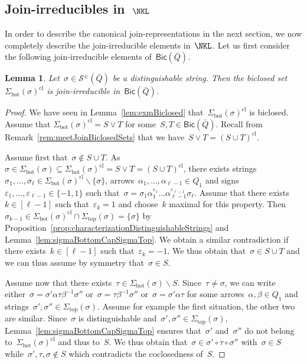 \documentclass{memo-l}
\newtheorem{lemma}[theorem]{Lemma}
\theoremstyle{definition}
\newcommand{\ssm}{\smallsetminus} %
\newcommand{\strings}{\mathcal{S}} %
\renewcommand{\top}{\mathrm{top}} %
\newcommand{\bottom}{\mathrm{bot}} %
\newcommand{\join}{\vee} %
\newcommand{\closure}[1]{#1^{\mathrm{cl}}} %
\newcommand{\Bicl}[1]{\mathsf{Bic}(#1)} %
\begin{document}
\subsection{Join-irreducibles in~$\NKL$}

In order to describe the canonical join-representations in the next section, we now completely describe the join-irreducible elements in~$\NKL$.
Let us first consider the following join-irreducible elements of~$\Bicl{\bar Q}$.

\begin{lemma}
\label{lem:exmBiclosedJI}
Let~$\sigma \in \strings^\pm(\bar Q)$ be a distinguishable string. Then the biclosed set~$\closure{\Sigma_\bottom(\sigma)}$ is join-irreducible in~$\Bicl{\bar Q}$.
\end{lemma}

\begin{proof}
We have seen in Lemma~\ref{lem:exmBiclosed} that~$\closure{\Sigma_\bottom(\sigma)}$ is biclosed.
Assume that $\closure{\Sigma_\bottom(\sigma)} = S \join T$ for some~$S,T \in \Bicl{\bar Q}$.
Recall from Remark~\ref{rem:meetJoinBiclosedSets} that we have~${S \join T = \closure{(S \cup T)}}$.

Assume first that~$\sigma \notin S \cup T$.
As~${\sigma \in \Sigma_\bottom(\sigma) \subseteq \closure{\Sigma_\bottom(\sigma)} = S \join T = \closure{(S \cup T)}}$, there exists strings~$\sigma_1, \dots, \sigma_\ell \in \closure{\Sigma_\bottom(\sigma)} \ssm \{\sigma\}$, arrows~$\alpha_1, \dots, \alpha_{\ell-1} \in Q_1$ and signs~$\varepsilon_1, \dots, \varepsilon_{\ell-1} \in \{-1,1\}$ such that~$\sigma = \sigma_1 \alpha_1^{\varepsilon_1} \dots \alpha_{\ell-1}^{\varepsilon_{\ell-1}} \sigma_\ell$.
Assume that there exists~$k \in [\ell-1]$ such that~$\varepsilon_k = 1$ and choose~$k$ maximal for this property.
Then~$\sigma_{k-1} \in \closure{\Sigma_\bottom(\sigma)} \cap \Sigma_\top(\sigma) = \{\sigma\}$ by Proposition~\ref{prop:characterizationDistinguishableStrings} and Lemma~\ref{lem:sigmaBottomCapSigmaTop}.
We obtain a similar contradiction if there exists~$k \in [\ell-1]$ such that~$\varepsilon_k = -1$.
We thus obtain that~$\sigma \in S \cup T$ and we can thus assume by symmetry that~$\sigma \in S$.

Assume now that there exists~$\tau \in \Sigma_\bottom(\sigma) \ssm S$.
Since~$\tau \ne \sigma$, we can write either~$\sigma = \sigma' \alpha \tau \beta^{-1} \sigma''$ or~$\sigma = \tau \beta^{-1} \sigma''$ or~$\sigma = \sigma' \alpha \tau$ for some arrows~$\alpha, \beta \in Q_1$ and strings~$\sigma', \sigma'' \in \Sigma_\top(\sigma)$.
Assume for example the first situation, the other two are similar.
Since~$\sigma$ is distinguishable and~${\sigma', \sigma'' \in \Sigma_\top(\sigma)}$, Lemma~\ref{lem:sigmaBottomCapSigmaTop} ensures that~$\sigma'$ and~$\sigma''$ do not belong to~$\closure{\Sigma_\bottom(\sigma)}$ and thus to~$S$.
We thus obtain that~$\sigma \in \sigma' \circ \tau \circ \sigma''$ with~$\sigma \in S$ while~$\sigma', \tau, \sigma \notin S$ which contradicts the coclosedness of~$S$.


\end{proof}
\end{document}
